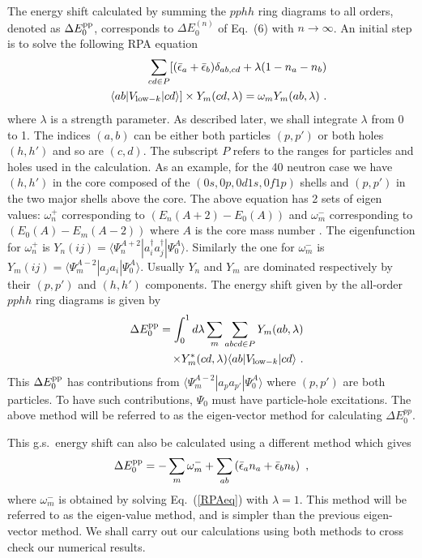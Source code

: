 \documentclass[twocolumn,preprintnumbers,superscriptaddress]{revtex4}
\begin{document}
The energy shift calculated by summing the $pphh$ ring diagrams to all orders, denoted as $\Delta E_0^{\rm pp}$,
corresponds to $\Delta E_0^{(n)}$ of Eq.~(6) with $n \rightarrow \infty$.
An initial step is to solve the following RPA equation
\cite{Siu2008,pphh1}
\begin{eqnarray}
&&\sum\limits_{cd\in P} [ (\bar \epsilon_a+\bar \epsilon _b ) \delta_{ab,cd} + \lambda (1-n_a-n_b)  \nonumber\\
&& ~ \langle ab|V_{{\rm low}-k}|cd \rangle ] \times Y_m(cd,\lambda) =
\omega_m Y_m(ab,\lambda)~.  \label{RPAeq}
\end{eqnarray}
where $\lambda$ is a strength parameter. As described later,
we shall integrate $\lambda$ from 0 to 1.
The indices $(a,b)$ can be either both particles $(p,p')$ or
both holes $(h,h')$ and so are $(c,d)$. The subscript $P$
refers to the ranges for particles and holes used in the
calculation. As an  example, for  the 40 neutron case
we have $(h,h')$ in the core composed of the
$(0s,0p,0d1s,0f1p)$ shells
and $(p,p')$ in the two major shells above the core.
The above equation has 2 sets of eigen values:
$\omega ^+_n$ corresponding to $(E_n(A+2)-E_0(A))$
and $\omega ^-_m$ corresponding to  $(E_0(A)-E_m(A-2))$
where $A$ is the core mass number \cite{Kuo1994}.
The eigenfunction for $\omega^+_n$ is
$Y_n(ij)=\langle\Psi_n^{A+2}|a^{\dagger}_ia^{\dagger}_j |\Psi _0^A\rangle$.
Similarly the  one for $\omega ^-_m$ is
$Y_m(ij)=\langle\Psi_m^{A-2}|a_ja_i |\Psi _0^A\rangle$.
Usually $Y_n$ and $Y_m$ are dominated respectively
by their $(p,p')$ and $(h,h')$ components. The energy shift given
by the all-order $pphh$ ring diagrams is given by \cite{pphh1}
\begin{eqnarray}
&&\Delta E_0^{\rm pp} = \int_0^1 d\lambda
 \sum\limits_m \sum\limits_{abcd\in P} Y_m(ab,\lambda) \nonumber \\
&& \times Y^*_m(cd,\lambda) \langle ab|V_{{\rm low}-k}|cd \rangle~. \label{eigen-vec}
\end{eqnarray}
This $\Delta E_0^{\rm pp}$ has contributions from
$\langle \Psi_m^{A-2}|a_pa_{p'} |\Psi _0^A\rangle$ where $(p,p')$ are both
particles. To have such contributions, $\Psi_0$ must have
particle-hole excitations. The above method will be
referred to as the eigen-vector method for calculating
$\Delta E_0^{pp}$.

This g.s.~energy shift can also be calculated using a different
method \cite{pphh2} which gives
\begin{eqnarray}
\Delta E_0^{\rm pp}= -  \sum_m \omega_m^-
 + \sum_{ab} \left( \bar \epsilon _a n_a + \bar \epsilon _b n_b \right)~, \label{eigen-val}
\end{eqnarray}
where $\omega_m^-$ is obtained by solving Eq.~(\ref{RPAeq}) with $\lambda=1$.
This method will be referred to as the eigen-value method, and  is simpler
than the previous eigen-vector method. We shall carry out our calculations
using both methods to cross check our numerical results.
\end{document}
